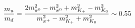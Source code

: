 \begin{equation} 
{m_u\over
m_d}= { 2m_{\pi^0}^2-m_{\pi^0}^2+m_{K_+}^2-m_{K_0}^2\over
m_{\pi^+}^2-m_{K_+}^2+m_{K_0}^2}\sim 0.55
\label{updown}
\end{equation} 

